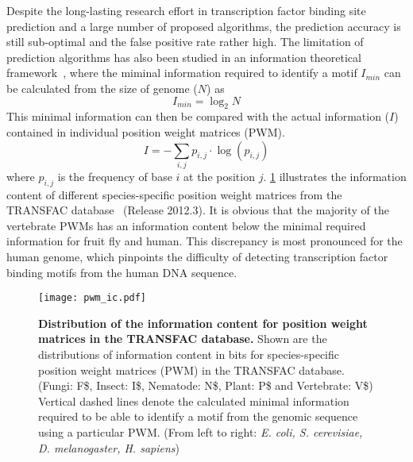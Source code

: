 Despite the long-lasting research effort in transcription factor binding site
prediction and a large number of proposed algorithms, the prediction accuracy 
is still sub-optimal and the false positive rate rather high. The limitation of
prediction algorithms has also been studied in an information theoretical
framework~\citep{Wunderlich2009}, where the miminal information required to identify a motif $I_{min}$ can be calculated from the size of genome ($N$) as
\begin{equation}
I_{min}=\log_2 N
\end{equation}
This minimal information can then be compared with the actual information ($I$) 
contained in individual position weight matrices (PWM).
\begin{equation}
\displaystyle I = -\sum_{i,j}p_{i,j} \cdot \log(p_{i,j})
\end{equation}
where $p_{i,j}$ is the frequency of base $i$ at the position $j$. \ref{fig:pwm_ic}
illustrates the information content of different species-specific position 
weight matrices from the TRANSFAC database~\citep{Matys2003b} (Release 2012.3). 
It is obvious that
the majority of the vertebrate PWMs has an information content below the 
minimal required information for fruit fly and human. This discrepancy is most
pronounced for the human genome, which pinpoints the difficulty of detecting 
transcription factor binding motifs from the human DNA sequence.

\begin{figure}[!ht]
\begin{center}
\texttt{[image: pwm\_ic.pdf]}
\end{center}
\caption[Information content of position weight matrices]{
{\bf Distribution of the information content for position weight matrices in 
the TRANSFAC database.}
Shown are the distributions of information content in bits for species-specific
position weight matrices (PWM) in the TRANSFAC database. (Fungi: F\$, Insect: I\$,
Nematode: N\$, Plant: P\$ and Vertebrate: V\$) Vertical dashed lines denote
the calculated minimal information required to be able to identify a motif from
the genomic sequence using a particular PWM. (From left to right: \emph{E. coli, 
S. cerevisiae, D. melanogaster, H. sapiens})
}
\label{fig:pwm_ic}
\end{figure}

